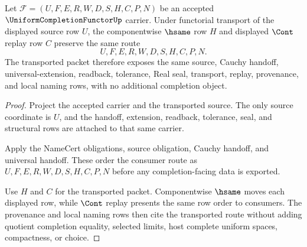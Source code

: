 \begin{theorem}
\label{thm:uniformcompletionfunctor-functorial-replay-stability}
Let $\mathcal{F}=(U,F,E,R,W,D,S,H,C,P,N)$ be an accepted $\UniformCompletionFunctorUp$ carrier. Under functorial transport of the displayed source row $U$, the componentwise $\hsame$ row $H$ and displayed $\Cont$ replay row $C$ preserve the same route
$$
U,F,E,R,W,D,S,H,C,P,N .
$$
The transported packet therefore exposes the same source, Cauchy handoff, universal-extension, readback, tolerance, Real seal, transport, replay, provenance, and local naming rows, with no additional completion object.
\end{theorem}
\begin{proof}
Project the accepted carrier and the transported source. The only source coordinate is $U$, and the handoff, extension, readback, tolerance, seal, and structural rows are attached to that same carrier.

Apply the NameCert obligations, source obligation, Cauchy handoff, and universal handoff. These order the consumer route as $U,F,E,R,W,D,S,H,C,P,N$ before any completion-facing data is exported.

Use $H$ and $C$ for the transported packet. Componentwise $\hsame$ moves each displayed row, while $\Cont$ replay presents the same row order to consumers. The provenance and local naming rows then cite the transported route without adding quotient completion equality, selected limits, host complete uniform spaces, compactness, or choice.
\end{proof}

